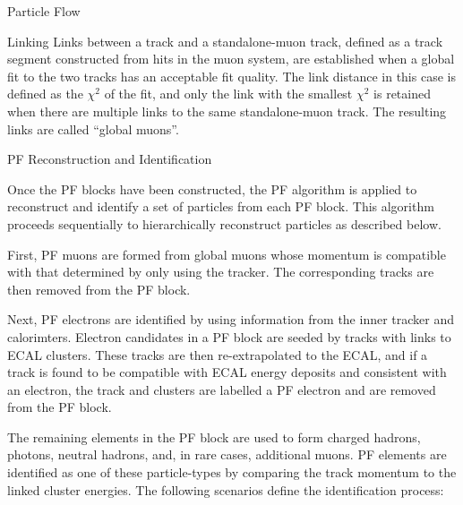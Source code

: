 \begin{section}{Particle Flow}
\begin{subsection}{Linking}
Links between a track and a standalone-muon track, defined as a track segment constructed from hits in the muon system, are established when a global fit to the two tracks has an acceptable fit quality.
The link distance in this case is defined as the $\chi^2$ of the fit, and only the link with the smallest $\chi^2$ is retained when there are multiple links to the same standalone-muon track.
The resulting links are called ``global muons''.

\end{subsection}

\begin{subsection}{PF Reconstruction and Identification}

Once the PF blocks have been constructed, the PF algorithm is applied to reconstruct and identify a set of particles from each PF block.
This algorithm proceeds sequentially to hierarchically reconstruct particles as described below.

First, PF muons are formed from global muons whose momentum is compatible with that determined by only using the tracker.
The corresponding tracks are then removed from the PF block.

Next, PF electrons are identified by using information from the inner tracker and calorimters.
Electron candidates in a PF block are seeded by tracks with links to ECAL clusters.
These tracks are then re-extrapolated to the ECAL, and if a track is found to be compatible with ECAL energy deposits and consistent with an electron, the track and clusters are labelled a PF electron and are removed from the PF block.

The remaining elements in the PF block are used to form charged hadrons, photons, neutral hadrons, and, in rare cases, additional muons.
PF elements are identified as one of these particle-types by comparing the track momentum to the linked cluster energies.
The following scenarios define the identification process:


\end{subsection}
\end{section}
